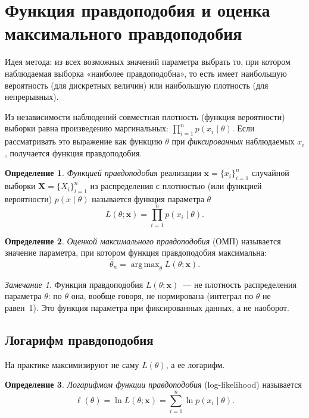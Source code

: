 \documentclass[a4paper,12pt]{article}
\theoremstyle{definition}
\newtheorem{definition}{Определение}
\theoremstyle{plain}
\theoremstyle{remark}
\newtheorem*{remark}{Замечание}
\DeclareMathOperator*{\argmax}{arg\,max}
\begin{document}
\section{Функция правдоподобия и оценка максимального правдоподобия}

Идея метода: из всех возможных значений параметра выбрать то, при котором наблюдаемая выборка «наиболее правдоподобна», то есть имеет наибольшую вероятность (для дискретных величин) или наибольшую плотность (для непрерывных).

Из независимости наблюдений совместная плотность (функция вероятности) выборки равна произведению маргинальных: $\prod_{i=1}^n p(x_i\mid\theta)$. Если рассматривать это выражение как функцию $\theta$ при \emph{фиксированных} наблюдаемых $x_i$, получается функция правдоподобия.

\begin{definition}
\emph{Функцией правдоподобия} реализации $\mathbf{x}=\{x_i\}_{i=1}^n$ случайной выборки $\mathbf{X}=\{X_i\}_{i=1}^n$ из распределения с плотностью (или функцией вероятности) $p(x\mid\theta)$ называется функция параметра $\theta$
$$L(\theta;\mathbf{x})=\prod_{i=1}^n p(x_i\mid\theta).$$
\end{definition}

\begin{definition}
\emph{Оценкой максимального правдоподобия} (ОМП) называется значение параметра, при котором функция правдоподобия максимальна:
$$\hat\theta_n=\argmax_{\theta}L(\theta;\mathbf{x}).$$
\end{definition}

\begin{remark}
Функция правдоподобия $L(\theta;\mathbf{x})$~--- не плотность распределения параметра $\theta$: по $\theta$ она, вообще говоря, не нормирована (интеграл по $\theta$ не равен~1). Это функция параметра при фиксированных данных, а не наоборот.
\end{remark}

\subsection{Логарифм правдоподобия}

На практике максимизируют не саму $L(\theta)$, а ее логарифм.

\begin{definition}
\emph{Логарифмом функции правдоподобия} (log-likelihood) называется
$$\ell(\theta)=\ln L(\theta;\mathbf{x})=\sum_{i=1}^n\ln p(x_i\mid\theta).$$
\end{definition}
\end{document}
